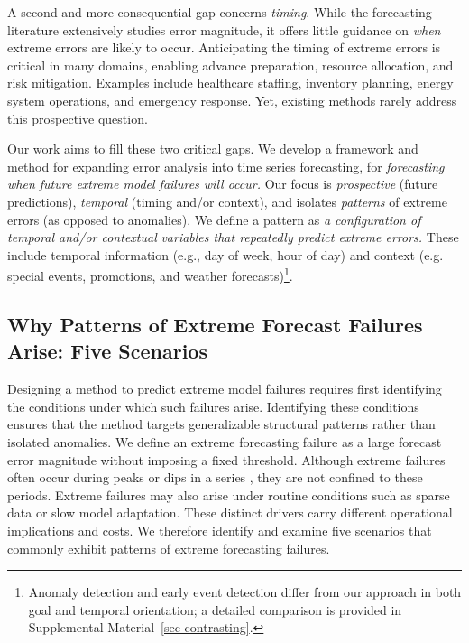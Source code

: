 \documentclass[12pt]{article}
\begin{document}
A second and more consequential gap concerns \emph{timing}. While the forecasting literature extensively studies error magnitude, it offers little guidance on \emph{when} extreme errors are likely to occur. Anticipating the timing of extreme errors is critical in many domains, enabling advance preparation, resource allocation, and risk mitigation. Examples include healthcare staffing, inventory planning, energy system operations, and emergency response. Yet, existing methods rarely address this prospective question.

Our work aims to fill these two critical gaps. We develop a framework and method for expanding error analysis into time series forecasting, for \textit{forecasting} \textit{when future extreme model failures will occur.} Our focus is \textit{prospective} (future predictions), \textit{temporal} (timing and/or context), and isolates \textit{patterns} of extreme errors (as opposed to anomalies). We define a pattern as \textit{a configuration of temporal and/or contextual} \textit{variables that repeatedly predict extreme errors.} These include temporal information (e.g., day of week, hour of day) and context (e.g. special events, promotions, and weather forecasts)\footnote{Anomaly detection and early event detection differ from our approach in both goal and temporal orientation; a detailed comparison is provided in Supplemental Material~\ref{sec-contrasting}.}.

\renewcommand{\arraystretch}{1.3}


\subsection{Why Patterns of Extreme Forecast Failures Arise:\newline
Five Scenarios}

Designing a method to predict extreme model failures requires first identifying the conditions under which such failures arise. Identifying  these conditions ensures that the method targets generalizable structural  patterns rather than isolated anomalies. We define an extreme forecasting failure as a large forecast error magnitude %
without imposing a fixed threshold.  Although extreme failures often occur during peaks or dips in a series  \citep{marvin2022}, they are not confined to these periods. Extreme failures may also arise under routine conditions such as sparse data or slow model adaptation. These distinct drivers carry different operational implications and costs. We therefore identify and examine five scenarios that commonly exhibit patterns of extreme forecasting failures.
\end{document}
